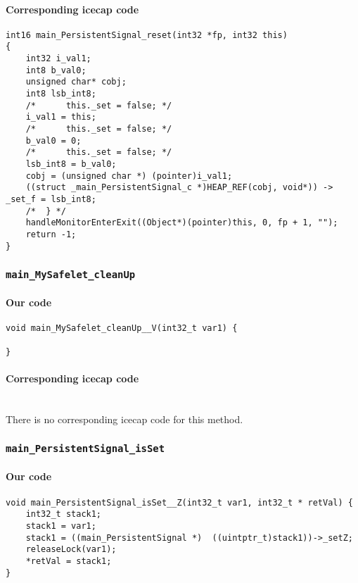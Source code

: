 \paragraph{Corresponding icecap code}\hfill
\begin{lstlisting}[firstnumber=54602]
int16 main_PersistentSignal_reset(int32 *fp, int32 this)
{
	int32 i_val1;
	int8 b_val0;
	unsigned char* cobj;
	int8 lsb_int8;
	/*		this._set = false; */
	i_val1 = this;
	/*		this._set = false; */
	b_val0 = 0;
	/*		this._set = false; */
	lsb_int8 = b_val0;
	cobj = (unsigned char *) (pointer)i_val1;
	((struct _main_PersistentSignal_c *)HEAP_REF(cobj, void*)) -> _set_f = lsb_int8;
	/*	} */
	handleMonitorEnterExit((Object*)(pointer)this, 0, fp + 1, "");
	return -1;
}
\end{lstlisting}

\subsubsection{\texttt{main\_MySafelet\_cleanUp}}

\paragraph{Our code}\hfill
\begin{lstlisting}[firstnumber=646]
void main_MySafelet_cleanUp__V(int32_t var1) {
	
}
\end{lstlisting}

\paragraph{Corresponding icecap code}\hfill\\
There is no corresponding icecap code for this method.

\subsubsection{\texttt{main\_PersistentSignal\_isSet}}

\paragraph{Our code}\hfill
\begin{lstlisting}[firstnumber=814]
void main_PersistentSignal_isSet__Z(int32_t var1, int32_t * retVal) {
	int32_t stack1;
	stack1 = var1;
	stack1 = ((main_PersistentSignal *)  ((uintptr_t)stack1))->_setZ;
	releaseLock(var1);
	*retVal = stack1;
}
\end{lstlisting}

